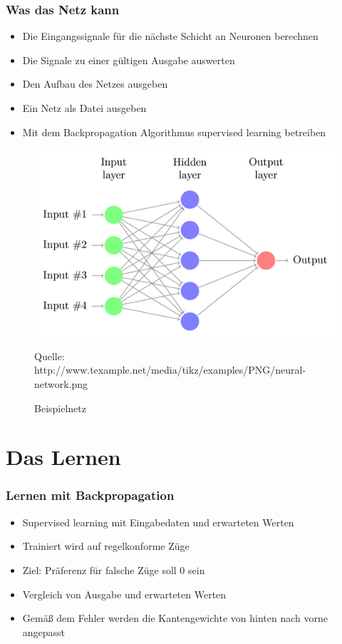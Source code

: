 \documentclass[compress]{beamer}
\begin{document}
\begin{frame}
	\frametitle{Was das Netz kann}
	
	\begin{itemize}
		\item Die Eingangssignale für die nächste Schicht an Neuronen berechnen
		\item Die Signale zu einer gültigen Ausgabe auswerten
		\item Den Aufbau des Netzes ausgeben
		\item Ein Netz als Datei ausgeben
		\item Mit dem Backpropagation Algorithmus supervised learning betreiben
	\end{itemize}
	
	\begin{figure}
		\begin{center}
			\includegraphics[scale=0.25]{net.png}
		\end{center}
		\caption{Beispielnetz}
		\begin{footnotesize}
		Quelle: http://www.texample.net/media/tikz/examples/PNG/neural-network.png
		\end{footnotesize}
		\label{fig:Netz}
	\end{figure}
	
\end{frame}

\section{Das Lernen}
\begin{frame}
	\frametitle{Lernen mit Backpropagation}
	
	\begin{itemize}
		\item Supervised learning mit Eingabedaten und erwarteten Werten
		\item Trainiert wird auf regelkonforme Züge
		\item Ziel: Präferenz für falsche Züge soll 0 sein
		\item Vergleich von Ausgabe und erwarteten Werten
		\item Gemäß dem Fehler werden die Kantengewichte von hinten nach vorne angepasst
	\end{itemize}
\end{frame}
\end{document}
